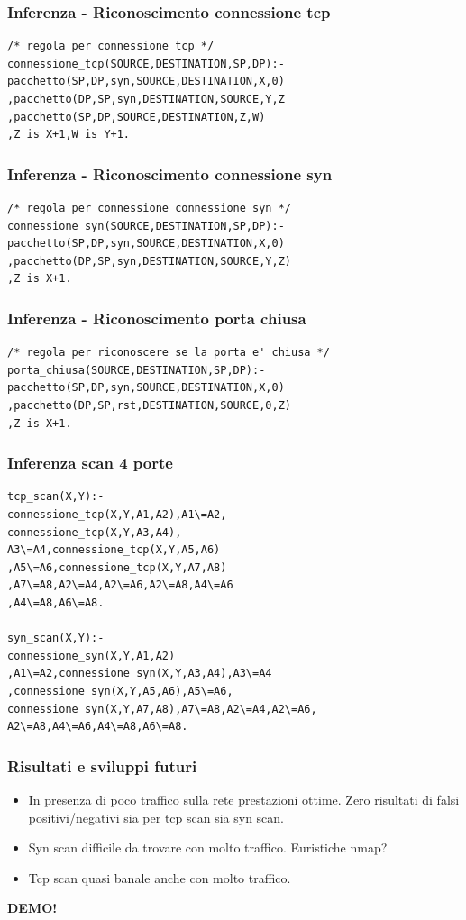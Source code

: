 \documentclass{beamer}
\begin{document}
\begin{frame}[fragile]
\frametitle{Inferenza - Riconoscimento connessione tcp}
\begin{lstlisting}
/* regola per connessione tcp */
connessione_tcp(SOURCE,DESTINATION,SP,DP):-
pacchetto(SP,DP,syn,SOURCE,DESTINATION,X,0)
,pacchetto(DP,SP,syn,DESTINATION,SOURCE,Y,Z
,pacchetto(SP,DP,SOURCE,DESTINATION,Z,W)
,Z is X+1,W is Y+1.
\end{lstlisting}


\end{frame}


\begin{frame}[fragile]
\frametitle{Inferenza - Riconoscimento connessione syn}
\begin{lstlisting}
/* regola per connessione connessione syn */
connessione_syn(SOURCE,DESTINATION,SP,DP):-
pacchetto(SP,DP,syn,SOURCE,DESTINATION,X,0)
,pacchetto(DP,SP,syn,DESTINATION,SOURCE,Y,Z)
,Z is X+1.

\end{lstlisting}
\end{frame}



\begin{frame}[fragile]
\frametitle{Inferenza - Riconoscimento porta chiusa}
\begin{lstlisting}
/* regola per riconoscere se la porta e' chiusa */
porta_chiusa(SOURCE,DESTINATION,SP,DP):-
pacchetto(SP,DP,syn,SOURCE,DESTINATION,X,0)
,pacchetto(DP,SP,rst,DESTINATION,SOURCE,0,Z)
,Z is X+1.

\end{lstlisting}
\end{frame}


\begin{frame}[fragile]
\frametitle{Inferenza scan 4 porte}
\begin{lstlisting}
tcp_scan(X,Y):- 
connessione_tcp(X,Y,A1,A2),A1\=A2,
connessione_tcp(X,Y,A3,A4),
A3\=A4,connessione_tcp(X,Y,A5,A6)
,A5\=A6,connessione_tcp(X,Y,A7,A8)
,A7\=A8,A2\=A4,A2\=A6,A2\=A8,A4\=A6
,A4\=A8,A6\=A8.

syn_scan(X,Y):- 
connessione_syn(X,Y,A1,A2)
,A1\=A2,connessione_syn(X,Y,A3,A4),A3\=A4
,connessione_syn(X,Y,A5,A6),A5\=A6,
connessione_syn(X,Y,A7,A8),A7\=A8,A2\=A4,A2\=A6,
A2\=A8,A4\=A6,A4\=A8,A6\=A8.
\end{lstlisting}
\end{frame}


\begin{frame}
\frametitle{Risultati e sviluppi futuri}

\begin{itemize}[<+->]
\item In presenza di poco traffico sulla rete prestazioni ottime. Zero risultati di falsi positivi/negativi
sia per tcp scan sia syn scan.
\item Syn scan difficile da trovare con molto traffico. Euristiche nmap? 
\item Tcp scan quasi banale anche con molto traffico.
\end{itemize}

\end{frame}




\begin{frame}
\begin{center}
{\huge \textbf{DEMO!}}
\end{center}
\end{frame}
\end{document}
